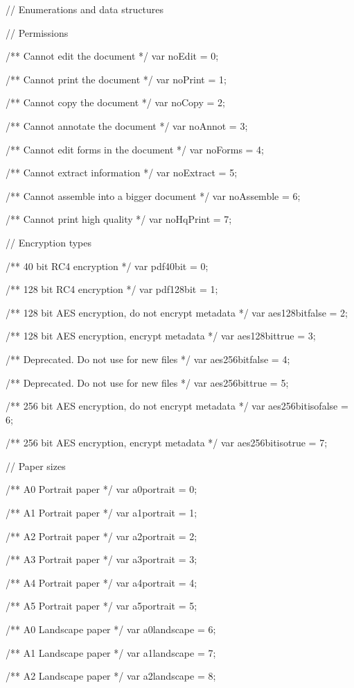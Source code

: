 // Enumerations and data structures


// Permissions

/** Cannot edit the document */
var noEdit = 0;

/** Cannot print the document */
var noPrint = 1;

/** Cannot copy the document */
var noCopy = 2;

/** Cannot annotate the document */
var noAnnot = 3;

/** Cannot edit forms in the document */
var noForms = 4;

/** Cannot extract information */
var noExtract = 5;

/** Cannot assemble into a bigger document */
var noAssemble = 6;

/** Cannot print high quality */
var noHqPrint = 7;


// Encryption types

/** 40 bit RC4 encryption */
var pdf40bit = 0;

/** 128 bit RC4 encryption */
var pdf128bit = 1;

/** 128 bit AES encryption, do not encrypt metadata */
var aes128bitfalse = 2;

/** 128 bit AES encryption, encrypt metadata */
var aes128bittrue = 3;

/** Deprecated. Do not use for new files */
var aes256bitfalse = 4;

/** Deprecated. Do not use for new files */
var aes256bittrue = 5;

/** 256 bit AES encryption, do not encrypt metadata */
var aes256bitisofalse = 6;

/** 256 bit AES encryption, encrypt metadata */
var aes256bitisotrue = 7;


// Paper sizes

/** A0 Portrait paper */
var a0portrait = 0;

/** A1 Portrait paper */
var a1portrait = 1;

/** A2 Portrait paper */
var a2portrait = 2;

/** A3 Portrait paper */
var a3portrait = 3;

/** A4 Portrait paper */
var a4portrait = 4;

/** A5 Portrait paper */
var a5portrait = 5;

/** A0 Landscape paper */
var a0landscape = 6;

/** A1 Landscape paper */
var a1landscape = 7;

/** A2 Landscape paper */
var a2landscape = 8;

